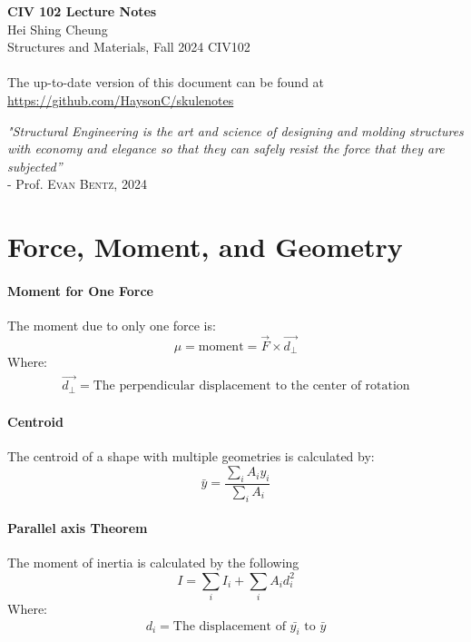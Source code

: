 \documentclass[11pt]{article}
\begin{document}
\thispagestyle{empty}
{\LARGE \bf CIV 102 Lecture Notes}\\
{\large Hei Shing Cheung}\\
Structures and Materials, Fall 2024 \hfill CIV102\\
\\
The up-to-date version of this document can be found at \url{https://github.com/HaysonC/skulenotes}\\

\begin{center}
\textit{"Structural Engineering is the art and science of designing and molding structures with economy and elegance so that they can safely resist the force that they are subjected''} \\ - Prof. \textsc{Evan Bentz, 2024}
\end{center}
\vspace{10pt}
\section{Force, Moment, and Geometry} 
    \paragraph{Moment for One Force} The moment due to only one force is:
    \begin{equation}
        \mu = \mathrm{moment} = \Vec{F}\times\Vec{d_\perp}
    \end{equation}
Where:
\begin{equation*}
\begin{split}
\Vec{d_\perp} = \text{The perpendicular displacement to the center of rotation}
\end{split}
\end{equation*}
\paragraph{Centroid} The centroid of a shape with multiple geometries is calculated by: 
\begin{equation}
\bar{y} = \frac{\sum_i A_i  y_i}{\sum_i A_i}
\end{equation}
\paragraph{Parallel axis Theorem} The moment of inertia is calculated by the following
\begin{equation}
    I = \sum_i I_{i} + \sum_i A_i d_i^2
\end{equation}
Where:
\begin{equation*}
\begin{split}
d_i = \text{The displacement of $\bar{y_i}$ to $\bar{y}$}
\end{split}
\end{equation*}
\end{document}
